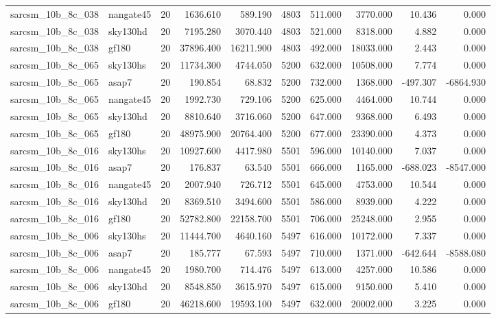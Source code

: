 \documentclass{article}
\begin{document}
\begin{longtable}{llrrrrrrrr}
sarcsm\_10b\_8c\_038 & nangate45 & 20 & 1636.610 & 589.190 & 4803 & 511.000 & 3770.000 & 10.436 & 0.000 \\
sarcsm\_10b\_8c\_038 & sky130hd & 20 & 7195.280 & 3070.440 & 4803 & 521.000 & 8318.000 & 4.882 & 0.000 \\
sarcsm\_10b\_8c\_038 & gf180 & 20 & 37896.400 & 16211.900 & 4803 & 492.000 & 18033.000 & 2.443 & 0.000 \\
sarcsm\_10b\_8c\_065 & sky130hs & 20 & 11734.300 & 4744.050 & 5200 & 632.000 & 10508.000 & 7.774 & 0.000 \\
sarcsm\_10b\_8c\_065 & asap7 & 20 & 190.854 & 68.832 & 5200 & 732.000 & 1368.000 & -497.307 & -6864.930 \\
sarcsm\_10b\_8c\_065 & nangate45 & 20 & 1992.730 & 729.106 & 5200 & 625.000 & 4464.000 & 10.744 & 0.000 \\
sarcsm\_10b\_8c\_065 & sky130hd & 20 & 8810.640 & 3716.060 & 5200 & 647.000 & 9368.000 & 6.493 & 0.000 \\
sarcsm\_10b\_8c\_065 & gf180 & 20 & 48975.900 & 20764.400 & 5200 & 677.000 & 23390.000 & 4.373 & 0.000 \\
sarcsm\_10b\_8c\_016 & sky130hs & 20 & 10927.600 & 4417.980 & 5501 & 596.000 & 10140.000 & 7.037 & 0.000 \\
sarcsm\_10b\_8c\_016 & asap7 & 20 & 176.837 & 63.540 & 5501 & 666.000 & 1165.000 & -688.023 & -8547.000 \\
sarcsm\_10b\_8c\_016 & nangate45 & 20 & 2007.940 & 726.712 & 5501 & 645.000 & 4753.000 & 10.544 & 0.000 \\
sarcsm\_10b\_8c\_016 & sky130hd & 20 & 8369.510 & 3494.600 & 5501 & 586.000 & 8939.000 & 4.222 & 0.000 \\
sarcsm\_10b\_8c\_016 & gf180 & 20 & 52782.800 & 22158.700 & 5501 & 706.000 & 25248.000 & 2.955 & 0.000 \\
sarcsm\_10b\_8c\_006 & sky130hs & 20 & 11444.700 & 4640.160 & 5497 & 616.000 & 10172.000 & 7.337 & 0.000 \\
sarcsm\_10b\_8c\_006 & asap7 & 20 & 185.777 & 67.593 & 5497 & 710.000 & 1371.000 & -642.644 & -8588.080 \\
sarcsm\_10b\_8c\_006 & nangate45 & 20 & 1980.700 & 714.476 & 5497 & 613.000 & 4257.000 & 10.586 & 0.000 \\
sarcsm\_10b\_8c\_006 & sky130hd & 20 & 8548.850 & 3615.970 & 5497 & 615.000 & 9150.000 & 5.410 & 0.000 \\
sarcsm\_10b\_8c\_006 & gf180 & 20 & 46218.600 & 19593.100 & 5497 & 632.000 & 20002.000 & 3.225 & 0.000 \\

\end{longtable}
\end{document}
